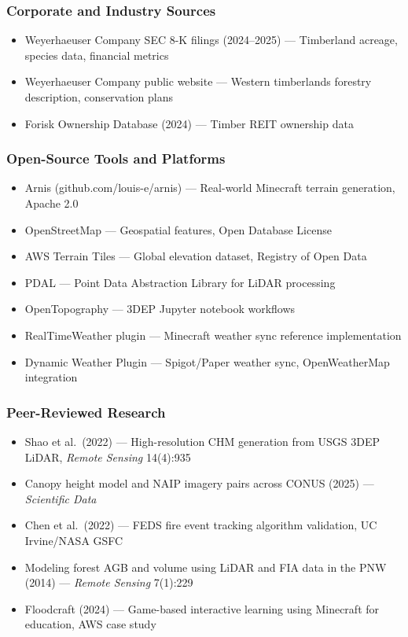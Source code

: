 \documentclass[11pt,letterpaper]{article}
\begin{document}
\subsubsection*{Corporate and Industry Sources}
\begin{itemize}[nosep]
  \item Weyerhaeuser Company SEC 8-K filings (2024--2025) --- Timberland acreage, species data, financial metrics
  \item Weyerhaeuser Company public website --- Western timberlands forestry description, conservation plans
  \item Forisk Ownership Database (2024) --- Timber REIT ownership data
\end{itemize}

\subsubsection*{Open-Source Tools and Platforms}
\begin{itemize}[nosep]
  \item Arnis (github.com/louis-e/arnis) --- Real-world Minecraft terrain generation, Apache 2.0
  \item OpenStreetMap --- Geospatial features, Open Database License
  \item AWS Terrain Tiles --- Global elevation dataset, Registry of Open Data
  \item PDAL --- Point Data Abstraction Library for LiDAR processing
  \item OpenTopography --- 3DEP Jupyter notebook workflows
  \item RealTimeWeather plugin --- Minecraft weather sync reference implementation
  \item Dynamic Weather Plugin --- Spigot/Paper weather sync, OpenWeatherMap integration
\end{itemize}

\subsubsection*{Peer-Reviewed Research}
\begin{itemize}[nosep]
  \item Shao et al.\ (2022) --- High-resolution CHM generation from USGS 3DEP LiDAR, \emph{Remote Sensing} 14(4):935
  \item Canopy height model and NAIP imagery pairs across CONUS (2025) --- \emph{Scientific Data}
  \item Chen et al.\ (2022) --- FEDS fire event tracking algorithm validation, UC Irvine/NASA GSFC
  \item Modeling forest AGB and volume using LiDAR and FIA data in the PNW (2014) --- \emph{Remote Sensing} 7(1):229
  \item Floodcraft (2024) --- Game-based interactive learning using Minecraft for education, AWS case study
\end{itemize}
\end{document}

